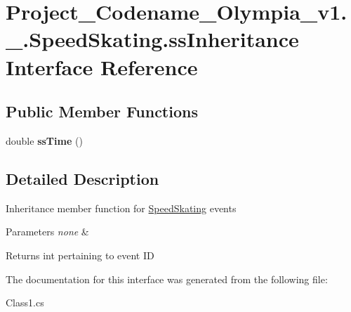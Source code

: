 \hypertarget{interfaceProject__Codename__Olympia__v1_1_1__0_1_1SpeedSkating_1_1ssInheritance}{}\section{Project\+\_\+\+Codename\+\_\+\+Olympia\+\_\+v1.\+\_.\+Speed\+Skating.\+ss\+Inheritance Interface Reference}
\label{interfaceProject__Codename__Olympia__v1_1_1__0_1_1SpeedSkating_1_1ssInheritance}
\subsection*{Public Member Functions}
\begin{DoxyCompactItemize}
\item 
\mbox{\label{interfaceProject__Codename__Olympia__v1_1_1__0_1_1SpeedSkating_1_1ssInheritance_a209a8c48215583ce3c04f5f19f75325e}} 
double {\bfseries ss\+Time} ()
\end{DoxyCompactItemize}


\subsection{Detailed Description}
Inheritance member function for \hyperlink{classProject__Codename__Olympia__v1_1_1__0_1_1SpeedSkating}{Speed\+Skating} events 
\begin{DoxyParams}{Parameters}
{\em none} & \\
\hline
\end{DoxyParams}
\begin{DoxyReturn}{Returns}
int pertaining to event ID 
\end{DoxyReturn}


The documentation for this interface was generated from the following file\+:\begin{DoxyCompactItemize}
\item 
Class1.\+cs\end{DoxyCompactItemize}
